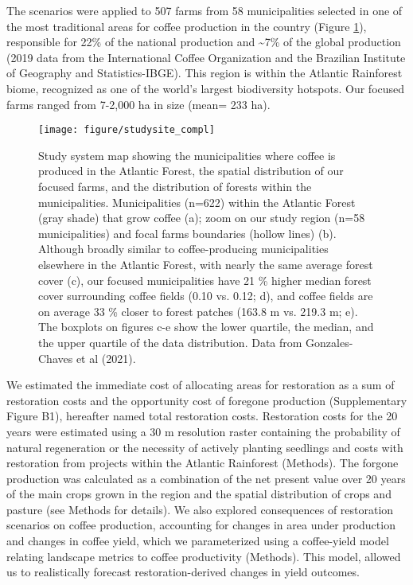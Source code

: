 \documentclass[
	12pt,				%
	oneside,			%
	a4paper,			%
	chapter=TITLE,		%
	section=TITLE,		%
	brazil,			%
	english				%
	]{abntex2}
\begin{document}
The scenarios were applied to 507 farms from 58 municipalities selected in one of the most traditional areas for coffee production in the country (Figure \ref{fig:studysite}), responsible for 22\% of the national production and \textasciitilde7\% of the global production (2019 data from the International Coffee Organization and the Brazilian Institute of Geography and Statistics-IBGE). This region is within the Atlantic Rainforest biome, recognized as one of the world's largest biodiversity hotspots. Our focused farms ranged from 7-2,000 ha in size (mean= 233 ha).
\begin{figure}[H]

{\centering \texttt{[image: figure/studysite\_compl]} 

}

\caption{Study system map showing the municipalities where coffee is produced in the Atlantic Forest, the spatial distribution of our focused farms, and the distribution of forests within the municipalities. Municipalities (n=622) within the Atlantic Forest (gray shade) that grow coffee (a); zoom on our study region (n=58 municipalities) and focal farms boundaries (hollow lines) (b). Although broadly similar to coffee-producing municipalities elsewhere in the Atlantic Forest, with nearly the same average forest cover (c), our focused municipalities have 21 \% higher median forest cover surrounding coffee fields (0.10 vs. 0.12; d), and coffee fields are on average 33 \% closer to forest patches (163.8 m vs. 219.3 m; e). The boxplots on figures c-e show the lower quartile, the median, and the upper quartile of the data distribution.  Data from Gonzales-Chaves et al (2021).}\label{fig:studysite}
\end{figure}
We estimated the immediate cost of allocating areas for restoration as a sum of restoration costs and the opportunity cost of foregone production (Supplementary Figure B1), hereafter named total restoration costs. Restoration costs for the 20 years were estimated using a 30 m resolution raster containing the probability of natural regeneration or the necessity of actively planting seedlings \autocite{crouzeilles_achieving_2019} and costs with restoration from projects within the Atlantic Rainforest \autocite{brancalion_what_2019} (Methods). The forgone production was calculated as a combination of the net present value over 20 years of the main crops grown in the region and the spatial distribution of crops and pasture (see Methods for details). We also explored consequences of restoration scenarios on coffee production, accounting for changes in area under production and changes in coffee yield, which we parameterized using a coffee-yield model relating landscape metrics to coffee productivity (Methods). This model, allowed us to realistically forecast restoration-derived changes in yield outcomes.
\end{document}
